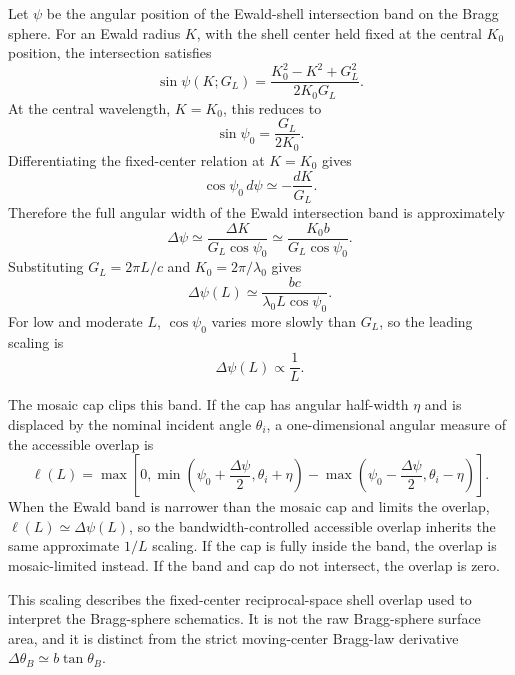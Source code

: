 \documentclass[11pt]{article}
\begin{document}
Let $\psi$ be the angular position of the Ewald-shell intersection band on the Bragg sphere. For an Ewald radius $K$, with the shell center held fixed at the central $K_0$ position, the intersection satisfies
\begin{equation}
\sin\psi(K;G_L)=\frac{K_0^2-K^2+G_L^2}{2K_0G_L}.
\end{equation}
At the central wavelength, $K=K_0$, this reduces to
\begin{equation}
\sin\psi_0=\frac{G_L}{2K_0}.
\end{equation}
Differentiating the fixed-center relation at $K=K_0$ gives
\begin{equation}
\cos\psi_0\,d\psi \simeq -\frac{dK}{G_L}.
\end{equation}
Therefore the full angular width of the Ewald intersection band is approximately
\begin{equation}
\Delta\psi \simeq \frac{\Delta K}{G_L\cos\psi_0}
             \simeq \frac{K_0 b}{G_L\cos\psi_0}.
\end{equation}
Substituting $G_L=2\pi L/c$ and $K_0=2\pi/\lambda_0$ gives
\begin{equation}
\Delta\psi(L) \simeq \frac{bc}{\lambda_0 L\cos\psi_0}.
\end{equation}
For low and moderate $L$, $\cos\psi_0$ varies more slowly than $G_L$, so the leading scaling is
\begin{equation}
\Delta\psi(L)\propto \frac{1}{L}.
\end{equation}

The mosaic cap clips this band. If the cap has angular half-width $\eta$ and is displaced by the nominal incident angle $\theta_i$, a one-dimensional angular measure of the accessible overlap is
\begin{equation}
\ell(L)=\max\left[0,
\min\left(\psi_0+\frac{\Delta\psi}{2},\theta_i+\eta\right)-
\max\left(\psi_0-\frac{\Delta\psi}{2},\theta_i-\eta\right)
\right].
\end{equation}
When the Ewald band is narrower than the mosaic cap and limits the overlap, $\ell(L)\simeq\Delta\psi(L)$, so the bandwidth-controlled accessible overlap inherits the same approximate $1/L$ scaling. If the cap is fully inside the band, the overlap is mosaic-limited instead. If the band and cap do not intersect, the overlap is zero.

This scaling describes the fixed-center reciprocal-space shell overlap used to interpret the Bragg-sphere schematics. It is not the raw Bragg-sphere surface area, and it is distinct from the strict moving-center Bragg-law derivative $\Delta\theta_B\simeq b\tan\theta_B$.
\end{document}

